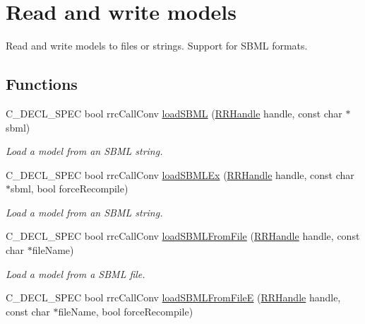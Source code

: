 \hypertarget{group__loadsave}{}\section{Read and write models}
\label{group__loadsave}


Read and write models to files or strings. Support for S\+B\+M\+L formats.  


\subsection*{Functions}
\begin{DoxyCompactItemize}
\item 
C\+\_\+\+D\+E\+C\+L\+\_\+\+S\+P\+E\+C bool rrc\+Call\+Conv \hyperlink{group__loadsave_gaeaaaf4f7855457d6207934149f52f5f9}{load\+S\+B\+M\+L} (\hyperlink{rrc__types_8h_a1d68f0592372208fa5a5f2799ea4b3ae}{R\+R\+Handle} handle, const char $\ast$sbml)
\begin{DoxyCompactList}\small\item\em Load a model from an S\+B\+M\+L string. \end{DoxyCompactList}\item 
C\+\_\+\+D\+E\+C\+L\+\_\+\+S\+P\+E\+C bool rrc\+Call\+Conv \hyperlink{group__loadsave_ga255d17e06e104da6a2f9e0696b1aa9e3}{load\+S\+B\+M\+L\+Ex} (\hyperlink{rrc__types_8h_a1d68f0592372208fa5a5f2799ea4b3ae}{R\+R\+Handle} handle, const char $\ast$sbml, bool force\+Recompile)
\begin{DoxyCompactList}\small\item\em Load a model from an S\+B\+M\+L string. \end{DoxyCompactList}\item 
C\+\_\+\+D\+E\+C\+L\+\_\+\+S\+P\+E\+C bool rrc\+Call\+Conv \hyperlink{group__loadsave_ga03cb924c6790b039f77a1a9c5dbcdda1}{load\+S\+B\+M\+L\+From\+File} (\hyperlink{rrc__types_8h_a1d68f0592372208fa5a5f2799ea4b3ae}{R\+R\+Handle} handle, const char $\ast$file\+Name)
\begin{DoxyCompactList}\small\item\em Load a model from a S\+B\+M\+L file. \end{DoxyCompactList}\item 
C\+\_\+\+D\+E\+C\+L\+\_\+\+S\+P\+E\+C bool rrc\+Call\+Conv \hyperlink{group__loadsave_gab2aa4b93a3037879a0da7dc85b3a9746}{load\+S\+B\+M\+L\+From\+File\+E} (\hyperlink{rrc__types_8h_a1d68f0592372208fa5a5f2799ea4b3ae}{R\+R\+Handle} handle, const char $\ast$file\+Name, bool force\+Recompile)

\end{DoxyCompactItemize}
